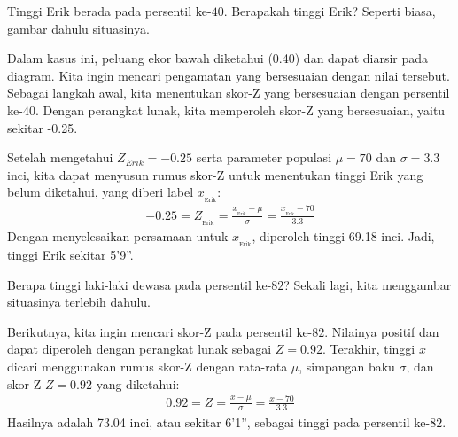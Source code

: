 \begin{examplewrap}
\begin{nexample}{Tinggi Erik berada pada persentil ke-$40$.
    Berapakah tinggi Erik?}\label{normalExam40Perc}
  Seperti biasa, gambar dahulu situasinya.\vspace{-4mm}
  \begin{center}
  \vspace{-1mm}
  \end{center}
  Dalam kasus ini, peluang ekor bawah diketahui (0.40) dan dapat
  diarsir pada diagram.
  Kita ingin mencari pengamatan yang bersesuaian dengan nilai tersebut.
  Sebagai langkah awal, kita menentukan skor-Z yang bersesuaian
  dengan persentil ke-$40$.
  Dengan perangkat lunak, kita memperoleh skor-Z yang bersesuaian,
  yaitu sekitar -0.25.

  Setelah mengetahui $Z_{Erik} = -0.25$ serta parameter populasi
  $\mu = 70$ dan $\sigma = 3.3$ inci, kita dapat menyusun rumus skor-Z
  untuk menentukan tinggi Erik yang belum diketahui, yang diberi label
  $x_{_{\text{Erik}}}$:
  \begin{align*}
  -0.25
    = Z_{_{\text{Erik}}}
    = \frac{x_{_{\text{Erik}}} - \mu}{\sigma}
    = \frac{x_{_{\text{Erik}}} - 70}{3.3}
  \end{align*}
  Dengan menyelesaikan persamaan untuk $x_{_{\text{Erik}}}$,
  diperoleh tinggi 69.18 inci.
  Jadi, tinggi Erik sekitar 5'9''.
\end{nexample}
\end{examplewrap}

\begin{examplewrap}
\begin{nexample}{Berapa tinggi laki-laki dewasa pada
    persentil ke-$82$?}
  Sekali lagi, kita menggambar situasinya terlebih dahulu.\vspace{-3mm}
  \begin{center}
  \vspace{-1mm}
  \end{center}
  Berikutnya, kita ingin mencari skor-Z pada persentil ke-$82$.
  Nilainya positif dan dapat diperoleh dengan perangkat lunak sebagai
  $Z = 0.92$.
  Terakhir, tinggi $x$ dicari menggunakan rumus skor-Z dengan rata-rata
  $\mu$, simpangan baku $\sigma$, dan skor-Z $Z = 0.92$ yang diketahui:
  \begin{align*}
  0.92 = Z = \frac{x-\mu}{\sigma} = \frac{x - 70}{3.3}
  \end{align*}
  Hasilnya adalah 73.04 inci, atau sekitar 6'1'', sebagai tinggi
  pada persentil ke-$82$.
\end{nexample}
\end{examplewrap}

